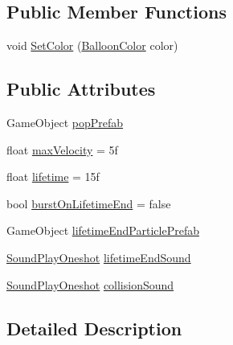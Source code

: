 \subsection*{Public Member Functions}
\begin{DoxyCompactItemize}
\item 
void \mbox{\hyperlink{class_valve_1_1_v_r_1_1_interaction_system_1_1_balloon_a2679347764a17cc6ea4b7796e25840fc}{Set\+Color}} (\mbox{\hyperlink{class_valve_1_1_v_r_1_1_interaction_system_1_1_balloon_afa934082ca64404919e75be87f823175}{Balloon\+Color}} color)
\end{DoxyCompactItemize}
\subsection*{Public Attributes}
\begin{DoxyCompactItemize}
\item 
Game\+Object \mbox{\hyperlink{class_valve_1_1_v_r_1_1_interaction_system_1_1_balloon_af1b5225b44a0d38b670ba83e12c62ea3}{pop\+Prefab}}
\item 
float \mbox{\hyperlink{class_valve_1_1_v_r_1_1_interaction_system_1_1_balloon_a1b167d6871badba1b00841dd1da5c10a}{max\+Velocity}} = 5f
\item 
float \mbox{\hyperlink{class_valve_1_1_v_r_1_1_interaction_system_1_1_balloon_aa098858e31abe72ad41875d715305847}{lifetime}} = 15f
\item 
bool \mbox{\hyperlink{class_valve_1_1_v_r_1_1_interaction_system_1_1_balloon_a1f7c2cfd35fbc4c26b2975c9492d488c}{burst\+On\+Lifetime\+End}} = false
\item 
Game\+Object \mbox{\hyperlink{class_valve_1_1_v_r_1_1_interaction_system_1_1_balloon_affc180f0a2a5d706801af79e50177bb4}{lifetime\+End\+Particle\+Prefab}}
\item 
\mbox{\hyperlink{class_valve_1_1_v_r_1_1_interaction_system_1_1_sound_play_oneshot}{Sound\+Play\+Oneshot}} \mbox{\hyperlink{class_valve_1_1_v_r_1_1_interaction_system_1_1_balloon_ae2830c0c649967ba1017603f35814c9c}{lifetime\+End\+Sound}}
\item 
\mbox{\hyperlink{class_valve_1_1_v_r_1_1_interaction_system_1_1_sound_play_oneshot}{Sound\+Play\+Oneshot}} \mbox{\hyperlink{class_valve_1_1_v_r_1_1_interaction_system_1_1_balloon_a142644f16fe9f66bbefd86ae5d338994}{collision\+Sound}}
\end{DoxyCompactItemize}


\subsection{Detailed Description}


